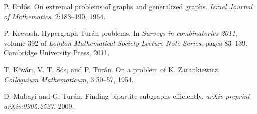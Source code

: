 \documentclass[12pt]{article}
\begin{document}

\begin{thebibliography}{99}

P. Erdős.
On extremal problems of graphs and generalized graphs.
\textit{Israel Journal of Mathematics}, 2:183–190, 1964.

P. Keevash.
Hypergraph Turán problems.
In \textit{Surveys in combinatorics 2011}, volume 392 of \textit{London Mathematical Society Lecture Note Series}, pages 83--139. Cambridge University Press, 2011.

T. Kővári, V. T. Sós, and P. Turán.
On a problem of K. Zarankiewicz.
\textit{Colloquium Mathematicum}, 3:50–57, 1954.

D. Mubayi and G. Turán.
Finding bipartite subgraphs efficiently.
\textit{arXiv preprint arXiv:0905.2527}, 2009.


\end{thebibliography}
\end{document}

